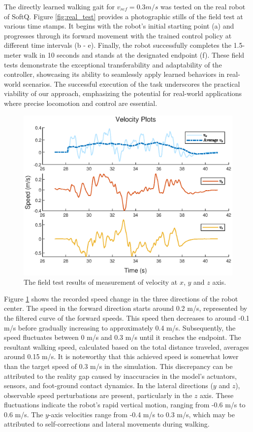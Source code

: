 The directly learned walking gait for $v_{ref} = 0.3m/s$ was tested on the real robot of SoftQ. Figure \ref{fig:real_test} provides a photographic stills of the field test at various time stamps. It begins with the robot's initial starting point (a) and progresses through its forward movement with the trained control policy at different time intervals (b - e). Finally, the robot successfully completes the 1.5-meter walk in 10 seconds and stands at the designated endpoint (f). These field tests demonstrate the exceptional transferability and adaptability of the controller, showcasing its ability to seamlessly apply learned behaviors in real-world scenarios. The successful execution of the task underscores the practical viability of our approach, emphasizing the potential for real-world applications where precise locomotion and control are essential.

\begin{figure}[htb]
    \centering
    \includegraphics[width=0.9\linewidth]{img/chap5/real_v.eps}
    \caption{The field test results of measurement of velocity at $x$, $y$ and $z$ axis.}
    \label{fig:real_v}
\end{figure}

Figure \ref{fig:real_v} shows the recorded speed change in the three directions of the robot center. The speed in the forward direction starts around 0.2 m/s, represented by the filtered curve of the forward speeds. This speed then decreases to around -0.1 m/s before gradually increasing to approximately 0.4 m/s. Subsequently, the speed fluctuates between 0 m/s and 0.3 m/s until it reaches the endpoint. The resultant walking speed, calculated based on the total distance traveled, averages around 0.15 m/s. It is noteworthy that this achieved speed is somewhat lower than the target speed of 0.3 m/s in the simulation. This discrepancy can be attributed to the reality gap caused by inaccuracies in the model's actuators, sensors, and foot-ground contact dynamics. In the lateral directions ($y$ and $z$), observable speed perturbations are present, particularly in the $z$ axis. These fluctuations indicate the robot's rapid vertical motion, ranging from -0.6 m/s to 0.6 m/s. The $y$-axis velocities range from -0.4 m/s to 0.3 m/s, which may be attributed to self-corrections and lateral movements during walking. 

